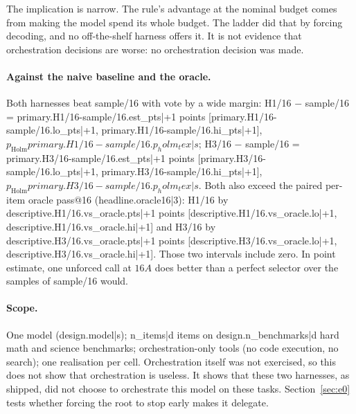 \documentclass[11pt]{article}
\begin{document}
{{{{{{{{{{{{The implication is narrow. The rule's advantage at the nominal budget comes from making the model spend its whole
budget. The ladder did that by forcing decoding, and no off-the-shelf harness offers it. It is not evidence that
orchestration decisions are worse: no orchestration decision was made.

\begin{table}[htbp]
\centering\small
{}
\caption{Each cell against the deep call at the same realized completion tokens per item (F2, macro,
descriptive). The deep accuracy is interpolated log-linearly in realized tokens between the two adjacent deep
rungs. The difference and its 95\% CI are one paired linear contrast (cell minus the weighted pair of deep
columns) over the items known in all three columns, so it can differ by a point from the difference of the two
printed accuracies. The rung-1 cells realized fewer tokens than deep/1
({{realized_vs_deep.deep_min_x|d}}) and are left out.}
\label{tab:rvd}
\end{table}

\paragraph{Against the naive baseline and the oracle.} Both harnesses beat sample/16 with vote by a wide
margin: H1/16 $-$ sample/16 = {{primary.H1/16-sample/16.est_pts|+1}} points
[{{primary.H1/16-sample/16.lo_pts|+1}}, {{primary.H1/16-sample/16.hi_pts|+1}}], $p_{\text{Holm}}
{{primary.H1/16-sample/16.p_holm_tex|s}}$; H3/16 $-$ sample/16 = {{primary.H3/16-sample/16.est_pts|+1}} points
[{{primary.H3/16-sample/16.lo_pts|+1}}, {{primary.H3/16-sample/16.hi_pts|+1}}], $p_{\text{Holm}}
{{primary.H3/16-sample/16.p_holm_tex|s}}$. Both also exceed the paired per-item oracle pass@16
({{headline.oracle16|3}}): H1/16 by {{descriptive.H1/16.vs_oracle.pts|+1}} points
[{{descriptive.H1/16.vs_oracle.lo|+1}}, {{descriptive.H1/16.vs_oracle.hi|+1}}] and H3/16 by
{{descriptive.H3/16.vs_oracle.pts|+1}} points [{{descriptive.H3/16.vs_oracle.lo|+1}},
{{descriptive.H3/16.vs_oracle.hi|+1}}]. Those two intervals include zero. In point estimate, one unforced call at $16A$ does better than a
perfect selector over the samples of sample/16 would.

\paragraph{Scope.} One model ({{design.model|s}}); {{n_items|d}} items on {{design.n_benchmarks|d}} hard math and
science benchmarks; orchestration-only tools (no code execution, no search); one realisation per cell.
Orchestration itself was not exercised, so this does not show that orchestration is useless. It shows that these
two harnesses, as shipped, did not choose to orchestrate this model on these tasks.
Section~\ref{sec:e0} tests whether forcing the root to stop early makes it delegate.

}}}}}}}}}}}}
\end{document}
